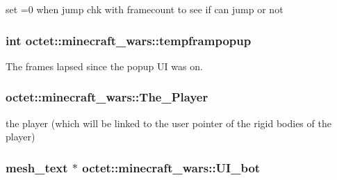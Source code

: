 set =0 when jump chk with framecount to see if can jump or not 

\hypertarget{classoctet_1_1minecraft__wars_af4669b717235fe938e43d8a6073ec3a9}{
\subsubsection[{tempframpopup}]{\setlength{\rightskip}{0pt plus 5cm}int octet\+::minecraft\+\_\+wars\+::tempframpopup\hspace{0.3cm}{\ttfamily [private]}}}\label{classoctet_1_1minecraft__wars_af4669b717235fe938e43d8a6073ec3a9}


The frames lapsed since the popup U\+I was on. 

\hypertarget{classoctet_1_1minecraft__wars_a645d3de2d70d3db06ca3762d75e5218c}{
\subsubsection[{The\+\_\+\+Player}]{ octet\+::minecraft\+\_\+wars\+::\+The\+\_\+\+Player\hspace{0.3cm}{\ttfamily [private]}}}\label{classoctet_1_1minecraft__wars_a645d3de2d70d3db06ca3762d75e5218c}


the player (which will be linked to the user pointer of the rigid bodies of the player) 

\hypertarget{classoctet_1_1minecraft__wars_a8de450040dd8662f5743104bc8f54c71}{
\subsubsection[{U\+I\+\_\+bot}]{\setlength{\rightskip}{0pt plus 5cm}mesh\+\_\+text $\ast$ octet\+::minecraft\+\_\+wars\+::\+U\+I\+\_\+bot\hspace{0.3cm}{\ttfamily [private]}}}\label{classoctet_1_1minecraft__wars_a8de450040dd8662f5743104bc8f54c71}


